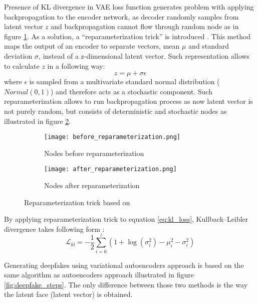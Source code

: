 Presence of KL divergence in VAE loss function generates problem with applying backpropagation to the encoder network, as decoder randomly samples from latent vector \(z\) and backpropagation cannot flow through random node as in figure \ref{subfig:before_reparameterization}. As a solution, a ``reparameterization trick'' is introduced \cite{reparameterization_trick_bib}. This method maps the output of an encoder to separate vectors, mean \(\mu\) and standard deviation \(\sigma\), instead of a z-dimensional latent vector. Such representation allows to calculate \(z\) in a following way:
%
\begin{equation}
\label{eq:rec_loss}
z = \mu + \sigma\epsilon
\end{equation}
%
where \(\epsilon\) is sampled from a multivariate standard normal distribution (\(Normal(0,1)\)) and therefore acts as a stochastic component. Such reparameterization allows to run backpropagation process as now latent vector is not purely random, but consists of deterministic and stochastic nodes as illustrated in figure \ref{subfig:after_reparameterization}.

\begin{figure}[H]
\centering
\begin{subfigure}{.5\textwidth}
  \centering
  \texttt{[image: before\_reparameterization.png]}
  \caption{Nodes before reparameterization}
  \label{subfig:before_reparameterization}
\end{subfigure}%
\begin{subfigure}{.5\textwidth}
  \centering
  \texttt{[image: after\_reparameterization.png]}
  \caption{Nodes after reparameterization}
  \label{subfig:after_reparameterization}
\end{subfigure}
\caption{Reparameterization trick based on \cite{vae_introduction_bib}}
\label{fig:reparameterization_trick}
\end{figure}

By applying reparameterization trick to equation \ref{eq:kl_loss}, Kullback–Leibler divergence takes following form \cite{kl_divergence_loss_bib}:
%
\begin{equation}
\label{eq:final_kl_loss}
\mathcal{L}_{kl} = -\frac{1}{2}\sum_{i=0}^{z}(1 + \log(\sigma_i^2) - \mu_i^2 -\sigma_i^2)
\end{equation}

Generating deepfakes using variational autoencoders approach is based on the same algorithm as autoencoders approach illustrated in figure \ref{fig:deepfake_steps}. The only difference between those two methods is the way the latent face (latent vector) is obtained.

